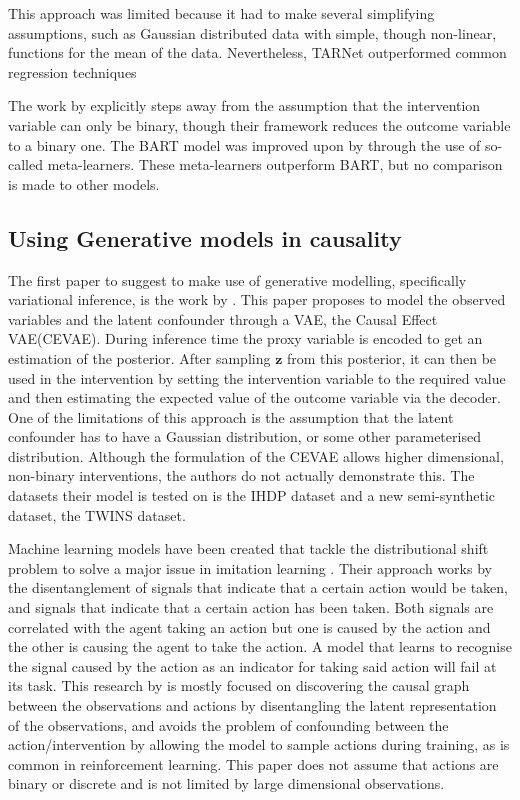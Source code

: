 \documentclass{report}
\newcommand{\bz}{\mathbf{z}}
\begin{document}
This approach was limited because it had to make several simplifying assumptions, such as Gaussian distributed data with simple, though non-linear, functions for the mean of the data. Nevertheless, TARNet outperformed common regression techniques

The work by \textcite{hu2020estimation} explicitly steps away from the assumption that the intervention variable can only be binary, though their framework reduces the outcome variable to a binary one. The BART model was improved upon by \textcite{kunzel2019metalearners} through the use of so-called meta-learners. These meta-learners outperform BART, but no comparison is made to other models.


\subsection{Using Generative models in causality}
The first paper to suggest to make use of generative modelling, specifically variational inference, is the work by \textcite{louizos2017causal}. This paper proposes to model the observed variables and the latent confounder through a VAE, the Causal Effect VAE(CEVAE). During inference time the proxy variable is encoded to get an estimation of the posterior. After sampling $\bz$ from this posterior, it can then be used in the intervention by setting the intervention variable to the required value and then estimating the expected value of the outcome variable via the decoder. One of the limitations of this approach is the assumption that the latent confounder has to have a Gaussian distribution, or some other parameterised distribution. Although the formulation of the CEVAE allows higher dimensional, non-binary interventions, the authors do not actually demonstrate this. The datasets their model is tested on is the IHDP dataset and a new semi-synthetic dataset, the TWINS dataset.
 
Machine learning models have been created that tackle the distributional shift problem to solve a major issue in imitation learning \parencite{de2019causal}. Their approach works by the disentanglement of signals that indicate that a certain action would be taken, and signals that indicate that a certain action has been taken. Both signals are correlated with the agent taking an action but one is caused by the action and the other is causing the agent to take the action. A model that learns to recognise the signal caused by the action as an indicator for taking said action will fail at its task. This research by \textcite{de2019causal} is mostly focused on discovering the causal graph between the observations and actions by disentangling the latent representation of the observations, and avoids the problem of confounding between the action/intervention by allowing the model to sample actions during training, as is common in reinforcement learning. This paper does not assume that actions are binary or discrete and is not limited by large dimensional observations.
 
\end{document}
